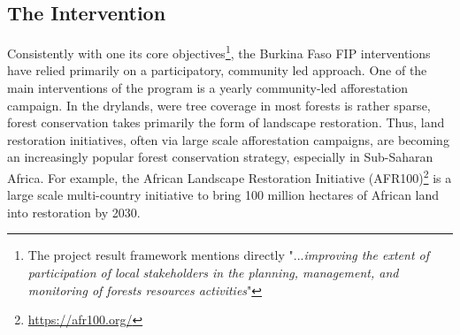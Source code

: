 \documentclass[preprint,12pt]{elsarticle}
\begin{document}
\subsection{The Intervention}

Consistently with one its core objectives\footnote{The project result framework mentions directly "...\textit{improving the extent of participation of local stakeholders in the planning, management, and monitoring of forests resources activities}"}, the Burkina Faso FIP interventions have relied primarily on a participatory, community led approach. One of the main interventions of the program is a yearly community-led afforestation campaign. In the drylands, were tree coverage in most forests is rather sparse, forest conservation takes primarily the form of landscape restoration. Thus, land restoration initiatives, often via large scale afforestation campaigns, are becoming an increasingly popular forest conservation strategy, especially in Sub-Saharan Africa. For example, the African Landscape Restoration Initiative (AFR100)\footnote{\url{https://afr100.org/}} is a large scale multi-country initiative to bring 100 million hectares of African land into restoration by 2030. 
\end{document}
